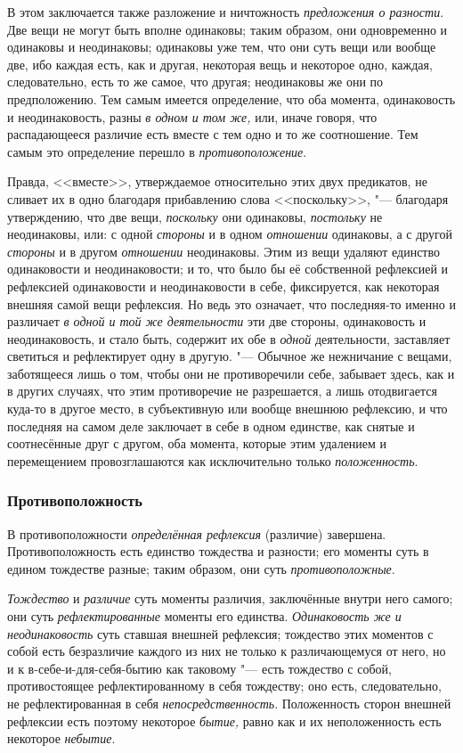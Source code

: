 В этом заключается также разложение и ничтожность {\em
предложения о разности}. Две вещи не могут быть вполне одинаковы; таким
образом, они одновременно и одинаковы и неодинаковы; одинаковы уже тем, что
они суть вещи или вообще две, ибо каждая есть, как и другая, некоторая вещь
и некоторое одно, каждая, следовательно, есть то же самое, что другая;
неодинаковы же они по предположению. Тем самым имеется определение, что оба
момента, одинаковость и неодинаковость, разны {\em в
одном и том же,} или, иначе говоря, что распадающееся различие есть вместе
с тем одно и то же соотношение. Тем самым это определение перешло в
{\em противоположение}.

Правда, <<вместе>>, утверждаемое относительно этих двух предикатов, не сливает
их в одно благодаря прибавлению слова <<поскольку>>, "--- благодаря
утверждению, что две вещи, {\em поскольку} они
одинаковы, {\em постольку} не неодинаковы, или: с одной
{\em стороны} и в одном {\em отношении} одинаковы, а с другой
{\em стороны} и в другом {\em отношении} неодинаковы. Этим из вещи удаляют
единство одинаковости и неодинаковости; и то, что было бы её собственной
рефлексией и рефлексией одинаковости и неодинаковости в себе, фиксируется,
как некоторая внешняя самой вещи рефлексия. Но ведь это означает, что
последняя-то именно и различает {\em в одной и той же
деятельности} эти две стороны, одинаковость и неодинаковость, и стало быть,
содержит их обе в {\em одной} деятельности, заставляет
светиться и рефлектирует одну в другую. "--- Обычное же нежничание с вещами,
заботящееся лишь о том, чтобы они не противоречили себе, забывает здесь,
как и в других случаях, что этим противоречие не разрешается, а лишь
отодвигается куда-то в другое место, в субъективную или вообще внешнюю
рефлексию, и что последняя на самом деле заключает в себе в одном единстве,
как снятые и соотнесённые друг с другом, оба момента, которые этим
удалением и перемещением провозглашаются как исключительно только
{\em положенность}.


\subsubsection{Противоположность}
В противоположности {\em определённая рефлексия} (различие) завершена.
Противоположность есть единство тождества и разности; его моменты суть в
едином тождестве разные; таким образом, они суть {\em противоположные}.

{\em Тождество} и {\em различие}
суть моменты различия, заключённые внутри него самого; они суть
{\em рефлектированные} моменты его единства.
{\em Одинаковость же и неодинаковость} суть ставшая
внешней рефлексия; тождество этих моментов с собой есть безразличие каждого
из них не только к различающемуся от него, но и к в-себе-и-для-себя-бытию
как таковому "--- есть тождество с собой, противостоящее рефлектированному в
себя тождеству; оно есть, следовательно, не рефлектированная в себя
{\em непосредственность}. Положенность сторон внешней
рефлексии есть поэтому некоторое {\em бытие,} равно как
и их неположенность есть некоторое {\em небытие}.

